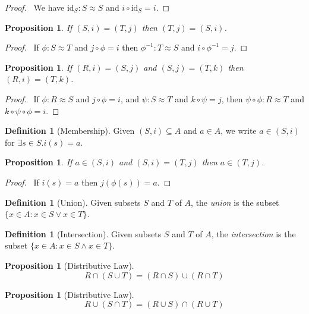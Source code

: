 \documentclass{book}
\let\qed\relax
\newtheorem{prop}[ax]{Proposition}
\theoremstyle{definition}
\newtheorem{df}[ax]{Definition}
\newcommand{\id}[1]{\ensuremath{\mathrm{id}_{#1}}}
\newcommand{\inv}[1]{\ensuremath{{#1}^{-1}}}
\begin{document}
\begin{proof}
\pf\ We have $\id{S} : S \approx S$ and $i \circ \id{S} = i$.
\end{proof}

\begin{prop}
If $(S,i) = (T,j)$ then $(T,j) = (S,i)$.
\end{prop}

\begin{proof}
\pf\ If $\phi : S \approx T$ and $j \circ \phi = i$ then $\inv{\phi} : T \approx S$ and $i \circ \inv{\phi} = j$. \qed
\end{proof}

\begin{prop}
If $(R,i) = (S,j)$ and $(S,j) = (T,k)$ then $(R,i) = (T,k)$.
\end{prop}

\begin{proof}
\pf\ If $\phi : R \approx S$ and $j \circ \phi = i$, and $\psi : S \approx T$ and $k \circ \psi = j$, then $\psi \circ \phi : R \approx T$ and $k \circ \psi \circ \phi = i$. \qed
\end{proof}

\begin{df}[Membership]
Given $(S,i) \subseteq A$ and $a \in A$, we write $a \in (S,i)$ for $\exists s \in S. i(s) = a$.
\end{df}

\begin{prop}
If $a \in (S,i)$ and $(S,i) = (T,j)$ then $a \in (T,j)$.
\end{prop}

\begin{proof}
\pf\ If $i(s) = a$ then $j(\phi(s)) = a$. \qed
\end{proof}

\begin{df}[Union]
Given subsets $S$ and $T$ of $A$, the \emph{union} is the subset $\{ x \in A : x \in S \vee x \in T \}$.
\end{df}

\begin{df}[Intersection]
Given subsets $S$ and $T$ of $A$, the \emph{intersection} is the subset $\{ x \in A : x \in S \wedge x \in T \}$.
\end{df}

\begin{prop}[Distributive Law]
\[ R \cap (S \cup T) = (R \cap S) \cup (R \cap T) \]
\end{prop}

\begin{prop}[Distributive Law]
\[ R \cup (S \cap T) = (R \cup S) \cap (R \cup T) \]
\end{prop}
\end{document}
